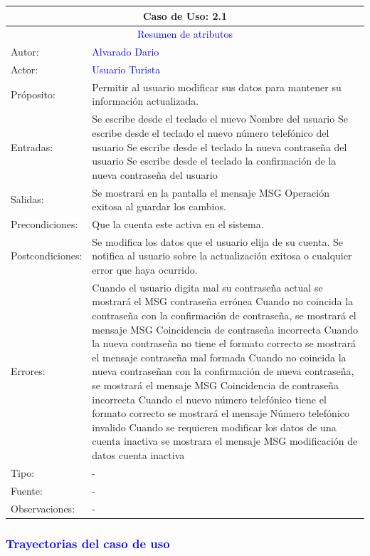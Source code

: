 \begin{tabularx}{16cm}{||l|X||}
	\hline
	\multicolumn{2}{||c||}{Caso de Uso: 2.1} \\
	\hline
	\multicolumn{2}{||c||}{\textcolor{blue}{Resumen de atributos}} \\
 \hline
	{Autor:} & {\textcolor{blue}{Alvarado Dario}} \\
	\hline
	\hline
	{Actor:} & {\textcolor{blue}{Usuario Turista}} \\
	\hline
	{Próposito:} & Permitir al usuario modificar sus datos para mantener su información actualizada.\\
	\hline
	{Entradas:} & {Se escribe desde el teclado el nuevo Nombre del usuario
 Se escribe desde el teclado el nuevo número telefónico del usuario
 Se escribe desde el teclado la nueva contraseña del usuario
 Se escribe desde el teclado la confirmación de la nueva contraseña del usuario
}
        \\
	\hline
	{Salidas:} & {Se mostrará en la pantalla el mensaje MSG Operación exitosa al guardar los cambios.}\\
	\hline
	{Precondiciones:} & {Que la cuenta este activa en el sistema.}\\
    \hline
	{Postcondiciones:} & {Se modifica los datos que el usuario elija de su cuenta.
 Se notifica al usuario sobre la actualización exitosa o cualquier error que haya ocurrido.}\\
	\hline
	{Errores:} & {Cuando el usuario digita mal su contraseña actual se mostrará el MSG contraseña errónea
 Cuando no coincida la contraseña con la confirmación de contraseña, se mostrará el mensaje MSG Coincidencia de contraseña incorrecta
 Cuando la nueva contraseña no tiene el formato correcto se mostrará el mensaje contraseña mal formada
 Cuando no coincida la nueva contraseñan con la confirmación de nueva contraseña, se mostrará el mensaje MSG Coincidencia de contraseña incorrecta
 Cuando el nuevo número telefónico tiene el formato correcto se mostrará el mensaje Número telefónico invalido
 Cuando se requieren modificar los datos de una cuenta inactiva se mostrara el mensaje MSG modificación de datos cuenta inactiva} \\
	\hline
	{Tipo:} & {-}\\
	\hline
	{Fuente:} & {-} \\
	\hline
	{Observaciones:} & {-} \\
	\hline
\end{tabularx}

\subsubsection{\textcolor{blue}{Trayectorias del caso de uso}}


